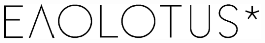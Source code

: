 \documentclass[letter, 10pt]{article}
\begin{document}
\begin{onehalfspacing}
\vfill
\begin{center}
	\includegraphics[scale = 0.4]{evolutus-black.eps}
\end{center}

\thispagestyle{fancy}
	
\end{onehalfspacing}
\end{document}

